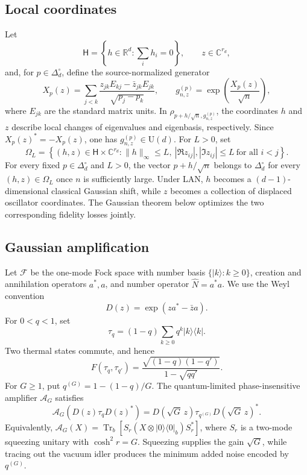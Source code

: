 \documentclass[11pt]{article}
\theoremstyle{remark}
\theoremstyle{plain}
\newcommand{\C}{\mathbb C}
\newcommand{\R}{\mathbb R}
\newcommand{\cA}{\mathcal A}
\newcommand{\cF}{\mathcal F}
\newcommand{\U}{\mathrm U}
\newcommand{\Tr}{\operatorname{Tr}}
\newcommand{\ket}[1]{|#1\rangle}
\newcommand{\proj}[1]{|#1\rangle\!\langle #1|}
\newcommand{\ot}{\otimes}
\begin{document}
\subsection{Local coordinates}
\label{sec:local-coordinates}

Let
\[
  \mathsf H=\left\{h\in\R^d:\sum_i h_i=0\right\},
  \qquad z\in\C^{r_d},
\]
and, for \(p\in\Delta_d^\circ\), define the source-normalized generator
\[
  X_p(z)=\sum_{j<k}
    \frac{z_{jk}E_{kj}-\bar z_{jk}E_{jk}}{\sqrt{p_j-p_k}},
  \qquad
  g_{n,z}^{(p)}=\exp\!\left(\frac{X_p(z)}{\sqrt n}\right),
\]
where \(E_{jk}\) are the standard matrix units.  In
\(\rho_{p+h/\sqrt n,g_{n,z}^{(p)}}\), the coordinates \(h\) and \(z\)
describe local changes of eigenvalues and eigenbasis, respectively.
Since \(X_p(z)^*=-X_p(z)\), one has
\(g_{n,z}^{(p)}\in\U(d)\).  For \(L>0\), set
\[
  \Omega_L
  =\left\{(h,z)\in\mathsf H\times\C^{r_d}:
  \|h\|_\infty\le L,\
  |\Re z_{ij}|,|\Im z_{ij}|\le L\ \text{for all }i<j\right\}.
\]
For every fixed \(p\in\Delta_d^\circ\) and \(L>0\), the vector
\(p+h/\sqrt n\) belongs to \(\Delta_d^\circ\) for every
\((h,z)\in\Omega_L\) once \(n\) is sufficiently large.  Under LAN, \(h\)
becomes a \((d-1)\)-dimensional classical Gaussian shift, while \(z\) becomes
a collection of displaced oscillator coordinates.  The Gaussian theorem
below optimizes the two corresponding fidelity losses jointly.

\subsection{Gaussian amplification}
\label{sec:gaussian-amplification}

Let \(\cF\) be the one-mode Fock space with number basis
\(\{\ket{k}:k\ge0\}\), creation and annihilation operators \(a^*,a\), and
number operator \(\widehat N=a^*a\).  We use the Weyl convention
\begin{equation}\label{eq:Weyl-convention}
  D(z)=\exp(z a^*-\bar z a).
\end{equation}
For \(0<q<1\), set
\[
  \tau_q=(1-q)\sum_{k\ge0}q^k\proj{k}.
\]
Two thermal states commute, and hence
\begin{equation}\label{eq:thermal-root-fidelity}
  F(\tau_q,\tau_{q'})
  =\frac{\sqrt{(1-q)(1-q')}}{1-\sqrt{qq'}}.
\end{equation}
For \(G\ge1\), put \(q^{(G)}=1-(1-q)/G\).  The quantum-limited
phase-insensitive amplifier \(\cA_G\) satisfies
\begin{equation}\label{eq:amplifier-action}
  \cA_G\!\left(D(z)\tau_qD(z)^*\right)
  =D(\sqrt G\,z)\tau_{q^{(G)}}D(\sqrt G\,z)^*.
\end{equation}
Equivalently,
\(\cA_G(X)=\Tr_b[S_r(X\ot\proj{0}_b)S_r^*]\), where \(S_r\) is a
two-mode squeezing unitary with \(\cosh^2 r=G\).  Squeezing supplies the
gain \(\sqrt G\), while tracing out the vacuum idler produces the minimum
added noise encoded by \(q^{(G)}\).
\end{document}
